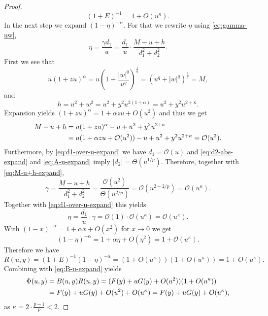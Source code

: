 \documentclass[10pt,a4paper]{amsart}
\begin{document}
\begin{proof}
\begin{equation}
      \label{eq:1+E-inv-expand}
        (1+E)^{-1} = 1 + O(u^\kappa).
    \end{equation}
    In the next step we expand $(1-\eta)^{-\alpha}$.
    For that we rewrite $\eta$ using \eqref{eq:gamma-uw},
    \[
        \eta = \frac{\gamma d_1}{u} = \frac{d_1}{u} \cdot \frac{M - u + h}{d_1^2+d_2^2}.
    \]
    First we see that
    \[
        u(1+zu)^\alpha = u \left( 1 + \frac{|w|^q}{u^q}\right)^{\frac 1q} = (u^q + |w|^q)^{\frac 1q} = M,
    \]
    and
    \[
        h = u^2 + w^2 = u^2 + y^2 u^{2(1+\alpha)} = u^2 + y^2 u^{2+\kappa}.
    \]
    Expansion yields $(1+zu)^\alpha = 1 + \alpha z u + O(u^2)$ and thus we get
    \begin{align}
        \label{eq:M-u+h-expand}
        M-u+h
        &= u(1+zu)^\alpha - u + u^2 + y^2 u^{2+\kappa} \notag\\
        &= u(1+\alpha z u + \mathcal{O}(u^2)) - u + u^2 + y^2 u^{2+\kappa} = \mathcal{O}(u^2).
    \end{align}
    Furthermore, by \eqref{eq:d1-over-u-expand} we have $d_1 = \mathcal{O}(u)$
    and \eqref{eq:d2-abs-expand} and \eqref{eq:A-u-expand} imply $|d_2| = \Theta(u^{1/p})$.
    Therefore, together with \eqref{eq:M-u+h-expand},
    \begin{equation}
        \label{eq:gamma-expand}
        \gamma = \frac{M - u + h}{d_1^2+d_2^2} = \frac{\mathcal{O}(u^2)}{\Theta(u^{2/p})} = \mathcal{O}(u^{2- 2/p}) = \mathcal{O}(u^\kappa).
    \end{equation}
    Together with \eqref{eq:d1-over-u-expand} this yields
    \[
        \eta = \frac{d_1}{u} \cdot \gamma = \mathcal{O}(1) \cdot \mathcal{O}(u^\kappa) = \mathcal{O}(u^\kappa).
    \]
    With $(1-x)^{-\alpha} = 1 + \alpha x + O(x^2)$ for $x \to 0$ we get
    \begin{equation}
      \label{eq:1-eta-alpha-expand}
        (1-\eta)^{-\alpha} = 1 + \alpha \eta + O(\eta^2) = 1 + \mathcal{O}(u^\kappa).
    \end{equation}
    Therefore we have
    \begin{equation}
        \label{eq:R-u-expand}
        R(u,y)= (1+E)^{-1}(1-\eta)^{-\alpha} = (1+O(u^\kappa))(1+O(u^\kappa)) = 1+O(u^\kappa).
    \end{equation}
    Combining with \eqref{eq:B-u-expand} yields
    \begin{align}
        \label{eq:phi-u-expand}
        \Phi(u,y) &= B(u,y)R(u,y) = (F(y) + uG(y) + O(u^2))(1+O(u^\kappa)) \notag\\
        &= F(y) + uG(y) + O(u^2) + O(u^\kappa) = F(y) + uG(y) + O(u^\kappa),
    \end{align}
    as $\kappa = 2\cdot \frac{p-1}{p} < 2$.


\end{proof}
\end{document}
